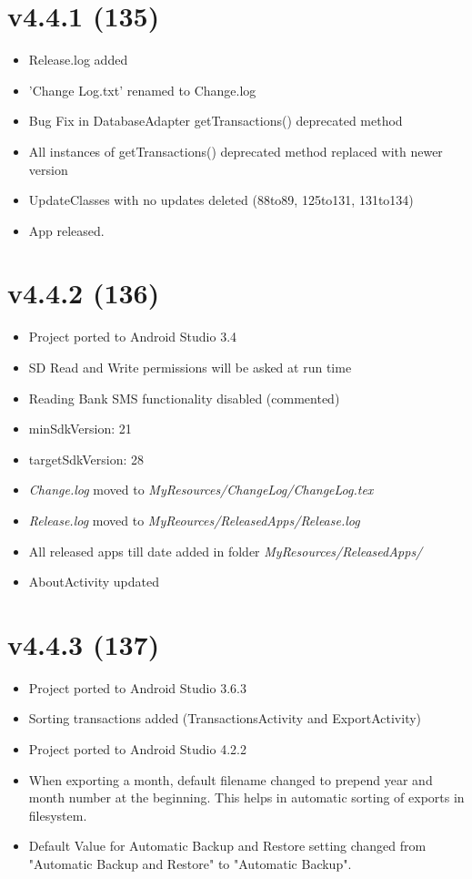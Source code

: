 \documentclass{article}
\begin{document}
    \section{v4.4.1 (135)}\label{sec:135}
    \begin{itemize}
        \item Release.log added
        \item 'Change Log.txt' renamed to Change.log
        \item Bug Fix in DatabaseAdapter getTransactions() deprecated method
        \item All instances of getTransactions() deprecated method replaced with newer version
        \item UpdateClasses with no updates deleted (88to89, 125to131, 131to134)
        \item App released.
    \end{itemize}

    \section{v4.4.2 (136)}\label{sec:136}
    \begin{itemize}
        \item Project ported to Android Studio 3.4
        \item SD Read and Write permissions will be asked at run time
        \item Reading Bank SMS functionality disabled (commented)
        \item minSdkVersion: 21
        \item targetSdkVersion: 28
        \item \textit{Change.log} moved to \textit{MyResources/ChangeLog/ChangeLog.tex}
        \item \textit{Release.log} moved to \textit{MyReources/ReleasedApps/Release.log}
        \item All released apps till date added in folder \textit{MyResources/ReleasedApps/}
        \item AboutActivity updated
    \end{itemize}


    \section{v4.4.3 (137)}\label{sec:137}
    \begin{itemize}
        \item Project ported to Android Studio 3.6.3
        \item Sorting transactions added (TransactionsActivity and ExportActivity)
        \item Project ported to Android Studio 4.2.2
        \item When exporting a month, default filename changed to prepend year and month number at the beginning.
        This helps in automatic sorting of exports in filesystem.
        \item Default Value for Automatic Backup and Restore setting changed from "Automatic Backup and Restore" to "Automatic Backup".
    \end{itemize}
\end{document}
